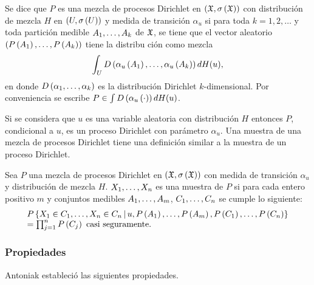 \begin{defi}[Antoniak]
Se dice que $P$ es una mezcla de procesos Dirichlet en $\left( \mathfrak{X}, \sigma\left( \mathfrak{X} \right) \right)$ con distribución de mezcla $H$ en %
$\left( U, \sigma\left( U \right) \right)$ y medida de transición $\alpha_{u}$ si para toda $k = 1,2 , \ldots$ y toda partición medible %
$A_{1}, \ldots, A_{k}$ de $\mathfrak{X}$, se tiene que el vector aleatorio $\left( P\left( A_{1} \right), \ldots, P\left( A_{k} \right) \right)$ tiene la distribu%
ción como mezcla
\[
\int_{U} D\left( \alpha_{u}\left( A_{1} \right), \ldots, \alpha_{u}\left( A_{k} \right) \right) d H(u),
\]
en donde $D\left( \alpha_{1}, \ldots, \alpha_{k} \right)$ es la distribución Dirichlet $k$-dimensional. Por conveniencia se escribe $ P %
\in \int D\Pp{\alpha_{u}\Pp{\cdot}} dH(u)$.
\end{defi}

Si se considera que $u$ es una variable aleatoria con distribución $H$ entonces $P$, condicional a $u$, es un proceso %
Dirichlet con parámetro $\alpha_{u}$. Una muestra de una mezcla de procesos Dirichlet tiene una definición similar a %
la muestra de un proceso Dirichlet.

\begin{defi}[Antoniak]
Sea $P$ una mezcla de procesos Dirichlet en $\left( \mathfrak{X}, \sigma\left( \mathfrak{X} \right) \right)$ con medida de transición $\alpha_{u}$ y distribución %
de mezcla $H$. $X_{1}, \ldots, X_{n}$ es una muestra de $P$ si para cada entero positivo $m$ y conjuntos medibles $\muestra{A}{%
m}$, $C_{1}, \ldots, C_{n}$ se cumple lo siguiente:
\[
\begin{array}{l}
P\Set{X_{1} \in C_{1}, \ldots, X_{n} \in C_{n} \,|\, u, P\Pp{A_{1}}, \ldots, P\Pp{A_{m}}, P\Pp{C_{1}}, \ldots, P\Pp{C_{%
n}}} \\
= \prod_{j = 1}^{n} P\Pp{C_{j}} \text{ casi seguramente.}
\end{array}
\]
\end{defi}

\subsubsection{Propiedades}

Antoniak estableció las siguientes propiedades.

